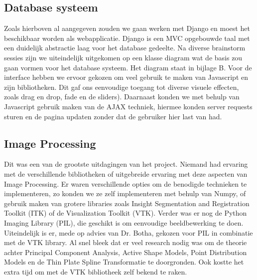 \subsection{Database systeem}
Zoals hierboven al aangegeven zouden we gaan werken met Django en moest het beschikbaar worden als webapplicatie. Django is een MVC opgebouwde taal met een duidelijk abstractie laag voor het database gedeelte. Na diverse brainstorm sessies zijn we uiteindelijk uitgekomen op een klasse diagram wat de basis zou gaan vormen voor het database systeem. Het diagram staat in bijlage B.
Voor de interface hebben we ervoor gekozen om veel gebruik te maken van Javascript en zijn bibliotheken. Dit gaf ons eenvoudige toegang tot diverse visuele effecten, zoals drag en drop, fade en de sliders). Daarnaast konden we met behulp van Javascript gebruik maken van de AJAX techniek, hiermee konden server requests sturen en de pagina updaten zonder dat de gebruiker hier last van had. 
\subsection{Image Processing}
Dit was een van de grootste uitdagingen van het project. Niemand had ervaring met de verschillende bibliotheken of uitgebreide ervaring met deze aspecten van Image Processing. Er waren verschillende opties om de benodigde technieken te implementeren, zo konden we ze zelf implementeren met behulp van Numpy, of gebruik maken van grotere libraries zoals Insight Segmentation and Registration Toolkit (ITK) of de Visualization Toolkit (VTK). Verder was er nog de Python Imaging Library (PIL), die geschikt is om eenvoudige beeldbewerking te doen. Uiteindelijk is er, mede op advies van Dr. Botha, gekozen voor PIL in combinatie met de VTK library. Al snel bleek dat er veel research nodig was om de theorie achter Principal Component Analysis, Active Shape Models, Point Distribution Models en de Thin Plate Spline Transformatie te doorgronden. Ook kostte het extra tijd om met de VTK bibliotheek zelf bekend te raken. 




